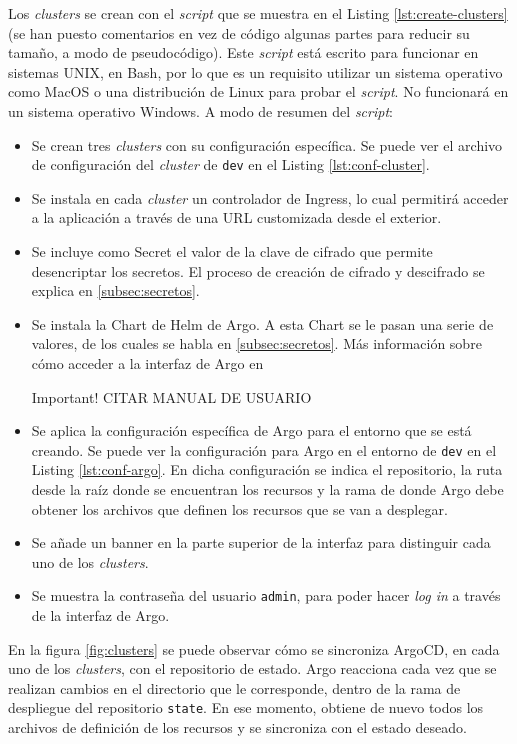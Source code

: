 Los \textit{clusters} se crean con el \textit{script} que se muestra en el Listing \ref{lst:create-clusters} (se han puesto comentarios en vez de código algunas partes para reducir su tamaño, a modo de pseudocódigo). Este \textit{script} está escrito para funcionar en sistemas UNIX, en Bash, por lo que es un requisito utilizar un sistema operativo como MacOS o una distribución de Linux para probar el \textit{script}. No funcionará en un sistema operativo Windows. A modo de resumen del \textit{script}:

\begin{itemize}
  \item Se crean tres \textit{clusters} con su configuración específica. Se puede ver el archivo de configuración del \textit{cluster} de \texttt{dev} en el Listing \ref{lst:conf-cluster}.
  \item Se instala en cada \textit{cluster} un controlador de Ingress, lo cual permitirá acceder a la aplicación a través de una URL customizada desde el exterior.
  \item Se incluye como Secret el valor de la clave de cifrado que permite desencriptar los secretos. El proceso de creación de cifrado y descifrado se explica en \ref{subsec:secretos}.
  \item Se instala la Chart de Helm de Argo. A esta Chart se le pasan una serie de valores, de los cuales se habla en \ref{subsec:secretos}. Más información sobre cómo acceder a la interfaz de Argo en
    \begin{bclogo}[logo=\bcattention]{Important!}
      CITAR MANUAL DE USUARIO
    \end{bclogo}
  \item Se aplica la configuración específica de Argo para el entorno que se está creando. Se puede ver la configuración para Argo en el entorno de \texttt{dev} en el Listing \ref{lst:conf-argo}. En dicha configuración se indica el repositorio, la ruta desde la raíz donde se encuentran los recursos y la rama de donde Argo debe obtener los archivos que definen los recursos que se van a desplegar.
  \item Se añade un banner en la parte superior de la interfaz para distinguir cada uno de los \textit{clusters}.
  \item Se muestra la contraseña del usuario \texttt{admin}, para poder hacer \textit{log in} a través de la interfaz de Argo.
\end{itemize}

En la figura \ref{fig:clusters} se puede observar cómo se sincroniza ArgoCD, en cada uno de los \textit{clusters}, con el repositorio de estado. Argo reacciona cada vez que se realizan cambios en el directorio que le corresponde, dentro de la rama de despliegue del repositorio \texttt{state}. En ese momento, obtiene de nuevo todos los archivos de definición de los recursos y se sincroniza con el estado deseado.

